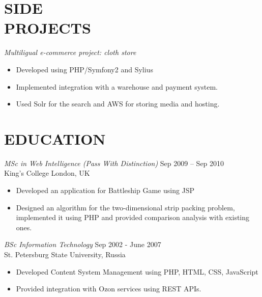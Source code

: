 \documentclass[margin]{res}
\begin{document}
\begin{resume}
\section{SIDE  \\ PROJECTS}
                {\sl Multiligual e-commerce project: cloth store}
                \begin{itemize} \itemsep -2pt
                    \item Developed using PHP/Symfony2 and Sylius 
                    \item Implemented integration with a warehouse and payment system.
                    \item Used Solr for the search and AWS for storing media and hosting.
                \end{itemize}

\section{EDUCATION} {\sl MSc in Web Intelligence (Pass With Distinction)} \hfill Sep 2009 – Sep 2010 \\
                King's College London, UK \\
                \begin{itemize} \itemsep -2pt
                    \item Developed an application for Battleship Game using JSP 
                    \item Designed an algorithm for the two-dimensional strip packing problem, implemented it using PHP and provided comparison analysis with existing ones.
                \end{itemize}


                {\sl BSc Information Technology} \hfill Sep 2002 - June 2007 \\
                St. Petersburg State University, Russia \\
                \begin{itemize} \itemsep -2pt
                    \item Developed Content System Management using PHP, HTML, CSS, JavaScript 
                    \item Provided integration with Ozon services using REST APIs.
                \end{itemize} 


\end{resume}
\end{document}
